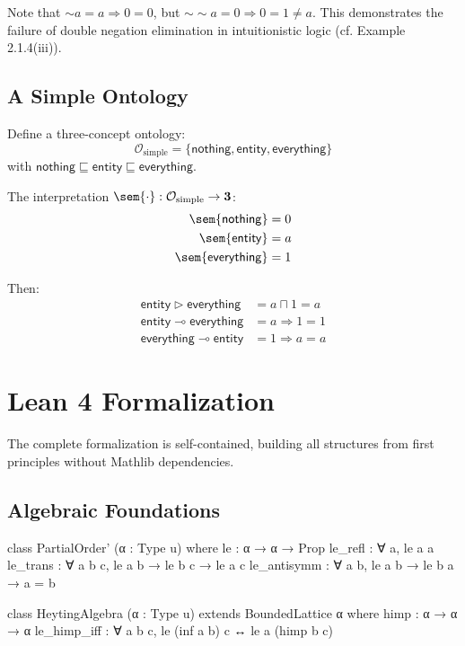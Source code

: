 \documentclass{itt-lean}
\begin{document}
\begin{observacao}
	Note that $\sim a = a \Rightarrow 0 = 0$, but $\sim\sim a = 0 \Rightarrow 0 = 1 \neq a$. This demonstrates the failure of double negation elimination in intuitionistic logic (cf. Example 2.1.4(iii)).
\end{observacao}

\subsection{A Simple Ontology}

Define a three-concept ontology:
$$
\mathcal{O}_{\text{simple}} = \{\mathsf{nothing}, \mathsf{entity}, \mathsf{everything}\}
$$
with $\mathsf{nothing} \sqsubseteq \mathsf{entity} \sqsubseteq \mathsf{everything}$.

The interpretation $\sem{\cdot} : \mathcal{O}_{\text{simple}} \to \mathbf{3}$:
\begin{align*}
	\sem{\mathsf{nothing}} &= 0 \\
	\sem{\mathsf{entity}} &= a \\
	\sem{\mathsf{everything}} &= 1
\end{align*}

Then:
\begin{align*}
	\mathsf{entity} \triangleright \mathsf{everything} &= a \sqcap 1 = a \\
	\mathsf{entity} \multimap \mathsf{everything} &= a \Rightarrow 1 = 1 \\
	\mathsf{everything} \multimap \mathsf{entity} &= 1 \Rightarrow a = a
\end{align*}

\section{Lean 4 Formalization}

The complete formalization is self-contained, building all structures from first principles without Mathlib dependencies.

\subsection{Algebraic Foundations}

\begin{leancode}
class PartialOrder' (α : Type u) where
  le : α → α → Prop
  le_refl : ∀ a, le a a
  le_trans : ∀ {a b c}, le a b → le b c → le a c
  le_antisymm : ∀ {a b}, le a b → le b a → a = b

class HeytingAlgebra (α : Type u) extends BoundedLattice α where
  himp : α → α → α
  le_himp_iff : ∀ {a b c}, le (inf a b) c ↔ le a (himp b c)
\end{leancode}
\end{document}
